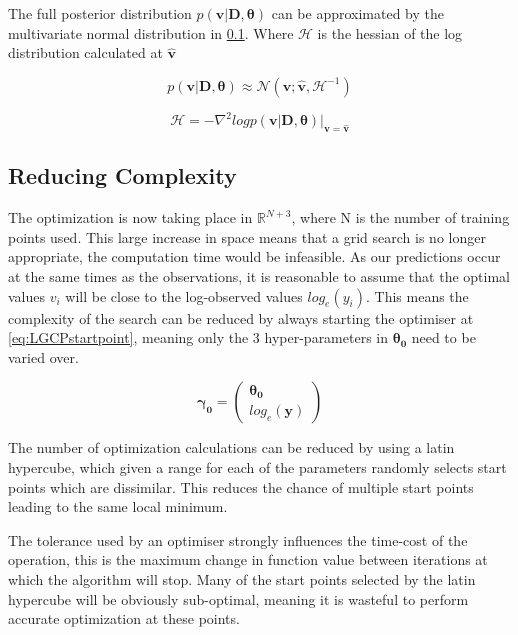 \documentclass[a4paper,11pt]{report}
\begin{document}
The full posterior distribution \(p(\mathbf{v|D},\boldsymbol{\theta})\) can be approximated by the multivariate normal distribution in \ref{}. Where \(\boldsymbol{\mathcal{H}}\) is the hessian of the log distribution calculated at \(\hat{\mathbf{v}}\) 

\singlespacing
\begin{equation}
p(\mathbf{v|D},\boldsymbol{\theta}) \approx \mathcal{N} (\mathbf{v}; \hat{\mathbf{v}}, \boldsymbol{\mathcal{H}}^{-1})
\end{equation}

\begin{equation}
\boldsymbol{\mathcal{H}} = -\nabla^2 log p(\mathbf{v|D},\boldsymbol{\theta}) |_{\mathbf{v}=\hat{\mathbf{v}}}
\end{equation}
\doublespacing

\subsection{Reducing Complexity}

The optimization is now taking place in \(\mathds{R}^{N+3}\), where N is the number of training points used. This large increase in space means that a grid search is no longer appropriate, the computation time would be infeasible. As our predictions occur at the same times as the observations, it is reasonable to assume that the optimal values \(v_i\) will be close to the log-observed values \(log_e(y_i)\). This means the complexity of the search can be reduced by always starting the optimiser at \ref{eq:LGCPstartpoint}, meaning only the 3 hyper-parameters in \(\boldsymbol{\theta_0}\) need to be varied over. \par

\begin{equation} \label{eq:LGCPstartpoint}
\boldsymbol{\gamma_0} = \left( \begin{array}{cc}
\boldsymbol{\theta_0} \\
log_e(\mathbf{y}) \end{array} \right) 
\end{equation}

The number of optimization calculations can be reduced by using a latin hypercube, which given a range for each of the parameters randomly selects start points which are dissimilar. This reduces the chance of multiple start points leading to the same local minimum. \par

The tolerance used by an optimiser strongly influences the time-cost of the operation, this is the maximum change in function value between iterations at which the algorithm will stop. Many of the start points selected by the latin hypercube will be obviously sub-optimal, meaning it is wasteful to perform accurate optimization at these points. \par
\end{document}
